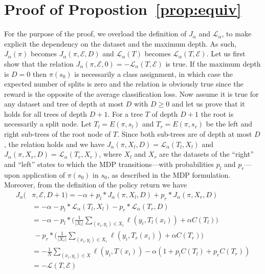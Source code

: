 \section{Proof of Propostion~\ref{prop:equiv}}
\label{sec:proof-equiv}
For the purpose of the proof, we overload the definition of $J_\alpha$ and $\mathcal L_\alpha$, to make explicit the dependency on the dataset and the maximum depth. 
As such, $J_\alpha(\pi)$ becomes $J_\alpha(\pi, {\mathcal E}, D)$ and ${\mathcal L}_\alpha(T)$ becomes ${\mathcal L}_\alpha(T, {\mathcal E})$. 
Let us first show that the relation $J_\alpha(\pi, {\mathcal E}, 0) = -{\mathcal L}_\alpha(T, {\mathcal E})$ is true. 
If the maximum depth is $D = 0$ then $\pi(s_0)$ is necessarily a class assignment, in which case the expected number of splits is zero and the relation is obviously true since the reward is the opposite of the average classification loss. 
Now assume it is true for any dataset and tree of depth at most $D$ with $D \geq 0$ and let us prove that it holds for all trees of depth $D + 1$. 
For a tree $T$ of depth $D + 1$ the root is necessarily a split node. Let $T_l = E(\pi, s_l)$ and $T_r = E(\pi, s_r)$ be the left and right sub-trees of the root node of $T$. 
Since both sub-trees are of depth at most $D$, the relation holds and we have $J_\alpha(\pi, X_l, D) = {\mathcal L}_\alpha(T_l, X_l)$ and $J_\alpha(\pi, X_r, D) = {\mathcal L}_\alpha(T_r, X_r)$, where $X_l$ and $X_r$ are the datasets of the ``right'' and ``left'' states to which the MDP transitions---with probabilities $p_l$ and $p_r$---upon application of $\pi(s_0)$ in $s_0$, as described in the MDP formulation. 
Moreover, from the definition of the policy return we have 
\begin{align*}
   J_\alpha(&\pi, {\mathcal E}, D + 1) = -\alpha + p_l * J_\alpha(\pi, X_l, D) + p_r * J_\alpha(\pi, X_r, D)\\
   &= -\alpha - p_l * {\mathcal L}_\alpha(T_l, X_l) - p_r * {\mathcal L}_\alpha(T_r, D)\\
   &= -\alpha - p_l * \Bigg(\frac{1}{|X_l|}\sum_{(x_i, y_i)\in X_l}\ell(y_i, T_l(x_i))  + \alpha C(T_l)\Bigg)\\
   &\ - p_r * \Bigg(\frac{1}{|X_r|}\sum_{(x_i, y_i)\in X_r}\ell(y_i, T_r(x_i))  + \alpha C(T_r)\Bigg)\\
   &= -\frac{1}{N}\sum_{(x_i, y_i)\in X}\ell(y_i, T(x_i)) - \alpha (1 + p_l C(T_l) + p_r C(T_r))\\
   &= -{\mathcal L}(T, {\mathcal E}) 
\end{align*}

